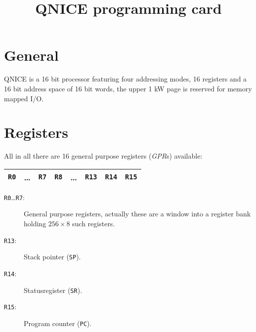 \documentclass{leaflet}
\begin{document}
 \title{QNICE programming card}
 \maketitle
%
 \section{General}
  QNICE is a 16 bit processor featuring four addressing modes, 16 registers and
  a 16 bit address space of 16 bit words, the upper 1 kW page is reserved for
  memory mapped I/O.
%
 \section{Registers}
  All in all there are 16 general purpose registers (\emph{GPR}s) available:
  \begin{center}
   \begin{longtable}{|c|c|c||c|c|c|c|c|}
    \hline
    {\tt R0}&\dots&{\tt R7}&{\tt R8}&\dots&{\tt R13}&{\tt R14}&{\tt R15}\\
    \hline
   \end{longtable}
  \end{center}
  \begin{description}
   \item [\texttt{R0}\dots\texttt{R7}:] General purpose registers, actually 
    these are a window into a register bank holding $256\times 8$ such 
    registers.
   \item [\texttt{R13}:] Stack pointer (\texttt{SP}).
   \item [\texttt{R14}:] Statusregister (\texttt{SR}).
   \item [\texttt{R15}:] Program counter (\texttt{PC}).
  \end{description}
%
\end{document}
